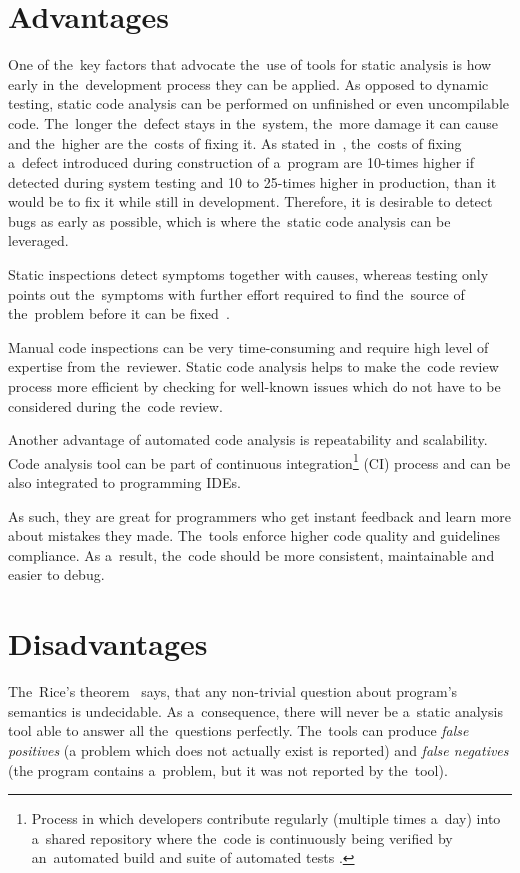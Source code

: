 \documentclass[
  digital, %
  table,   %
  lof,     %
  lot,     %
  oneside,
]{fithesis3}
\begin{document}
\section{Advantages}
One of the~key factors that advocate the~use of tools for static analysis is how early in the~development process they can be applied. As opposed to dynamic testing, static code analysis can be performed on unfinished or even uncompilable code. The~longer the~defect stays in the~system, the~more damage it can cause and the~higher are the~costs of fixing it. As stated in~\cite[p. 29]{code-complete}, the~costs of fixing a~defect introduced during construction of a~program are 10-times higher if detected during system testing and 10 to 25-times higher in production, than it would be to fix it while still in development. Therefore, it is desirable to detect bugs as early as possible, which is where the~static code analysis can be leveraged.

Static inspections detect symptoms together with causes, whereas testing only points out the~symptoms with further effort required to find the~source of the~problem before it can be fixed~\cite[p. 472]{code-complete}.

Manual code inspections can be very time-consuming and require high level of expertise from the~reviewer. Static code analysis helps to make the~code review process more efficient by checking for well-known issues which do not have to be considered during the~code review.

Another advantage of automated code analysis is repeatability and scalability. Code analysis tool can be part of continuous integration\footnote{Process in which developers contribute regularly (multiple times a~day) into a~shared repository where the~code is continuously being verified by an~automated build and suite of automated tests \cite{continuous-integration-fowler}.} (CI) process and can be also integrated to programming IDEs.

As such, they are great for programmers who get instant feedback and learn more about mistakes they made. The~tools enforce higher code quality and guidelines compliance. As a~result, the~code should be more consistent, maintainable and easier to debug.
  
\section{Disadvantages}
The~Rice's theorem~\cite{direct-proofs-of-rices-theorem} says, that any non-trivial question about program's semantics is undecidable. As a~consequence, there will never be a~static analysis tool able to answer all the~questions perfectly. The~tools can produce \textit{false positives} (a problem which does not actually exist is reported) and \textit{false negatives} (the program contains a~problem, but it was not reported by the~tool).
\end{document}
